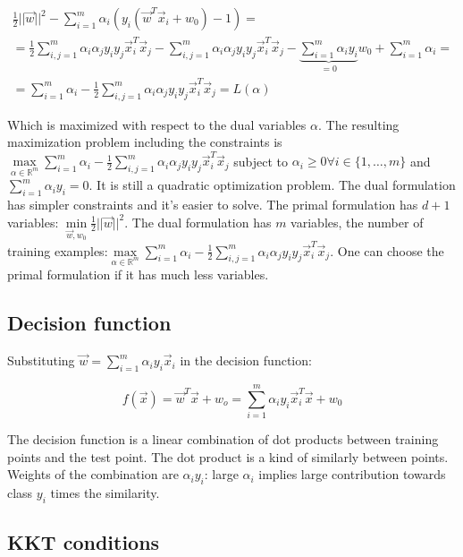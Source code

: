 		\begin{align*}
			\frac{1}{2}||\vec{w}||^2-\sum\limits_{i=1}^m\alpha_i(y_i(\vec{w}^T\vec{x}_i+w_0)-1)=\\
			=\frac{1}{2}\sum\limits_{i,j=1}^m\alpha_i\alpha_jy_iy_j\vec{x}_i^T\vec{x}_j-\sum\limits_{i,j=1}^m\alpha_i\alpha_jy_iy_j\vec{x}_i^T\vec{x}_j-\underbrace{\sum\limits_{i=1}^m\alpha_iy_i}_{=0}w_0+\sum\limits_{i=1}^m\alpha_i=\\
			=\sum\limits_{i=1}^m\alpha_i-\frac{1}{2}\sum\limits_{i,j=1}^m\alpha_i\alpha_jy_iy_j\vec{x}^T_i\vec{x}_j = L(\alpha)
		\end{align*}

		Which is maximized with respect to the dual variables $\alpha$.
		The resulting maximization problem including the constraints is $\max\limits_{\alpha\in\mathbb{R}^m}\sum\limits_{i=1}^m\alpha_i-\frac{1}{2}\sum\limits_{i,j=1}^m\alpha_i\alpha_jy_iy_j\vec{x}^T_i\vec{x}_j$ subject to $\alpha_i\ge 0\forall i\in\{1, \dots, m\}$ and $\sum\limits_{i=1}^m\alpha_iy_i = 0$.
		It is still a quadratic optimization problem.
		The dual formulation has simpler constraints and it's easier to solve.
		The primal formulation has $d+1$ variables: $\min\limits_{\vec{w},w_0}\frac{1}{2}||\vec{w}||^2$.
		The dual formulation has $m$ variables, the number of training examples:$\max\limits_{\alpha\in\mathbb{R}^m}\sum\limits_{i=1}^m\alpha_i-\frac{1}{2}\sum\limits_{i,j=1}^m\alpha_i\alpha_jy_iy_j\vec{x}^T_i\vec{x}_j$.
		One can choose the primal formulation if it has much less variables.

	\subsection{Decision function}
	Substituting $\vec{w}=\sum\limits_{i=1}^m\alpha_iy_i\vec{x}_i$ in the decision function:

	$$f(\vec{x}) = \vec{w}^T\vec{x}+w_o = \sum\limits_{i=1}^m\alpha_iy_i\vec{x}^T_i\vec{x} + w_0$$

	The decision function is a linear combination of dot products between training points and the test point.
	The dot product is a kind of similarly between points.
	Weights of the combination are $\alpha_iy_i$: large $\alpha_i$ implies large contribution towards class $y_i$ times the similarity.

	\subsection{KKT conditions}

